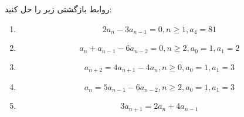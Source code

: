 \EXERCISE
روابط بازگشتی زیر را حل کنید:
\begin{enumerate}
\item
$$2a_n - 3a_{n-1} = 0, n \geq 1, a_4 = 81$$
\item
$$a_n + a_{n-1} - 6a_{n-2} = 0, n \geq 2, a_0 = 1, a_1 = 2$$
\item
$$a_{n+2} = 4a_{n+1} - 4a_n, n \geq 0, a_0 = 1, a_1 = 3$$
\item
$$a_n = 5a_{n-1} - 6a_{n-2}, n \geq 2, a_0 = 1, a_1 = 3$$
\item
$$3a_{n+1} = 2a_n + 4a_{n-1}$$
\end{enumerate}